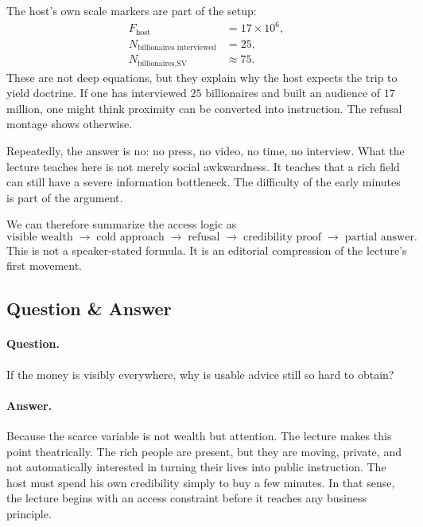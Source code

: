 The host's own scale markers are part of the setup:
\begin{align}
F_{\text{host}} &= 17 \times 10^6,\\
N_{\text{billionaires interviewed}} &= 25,\\
N_{\text{billionaires,SV}} &\approx 75.
\end{align}
These are not deep equations, but they explain why the host expects the trip to yield doctrine. If one has interviewed \(25\) billionaires and built an audience of \(17\) million, one might think proximity can be converted into instruction. The refusal montage shows otherwise.

Repeatedly, the answer is no: no press, no video, no time, no interview. What the lecture teaches here is not merely social awkwardness. It teaches that a rich field can still have a severe information bottleneck. The difficulty of the early minutes is part of the argument.

We can therefore summarize the access logic as
\begin{equation}
\text{visible wealth}
\;\to\;
\text{cold approach}
\;\to\;
\text{refusal}
\;\to\;
\text{credibility proof}
\;\to\;
\text{partial answer}.
\end{equation}
This is not a speaker-stated formula. It is an editorial compression of the lecture's first movement.

\subsection{Question \& Answer}

\paragraph{Question.} If the money is visibly everywhere, why is usable advice still so hard to obtain?

\paragraph{Answer.} Because the scarce variable is not wealth but attention. The lecture makes this point theatrically. The rich people are present, but they are moving, private, and not automatically interested in turning their lives into public instruction. The host must spend his own credibility simply to buy a few minutes. In that sense, the lecture begins with an access constraint before it reaches any business principle.

